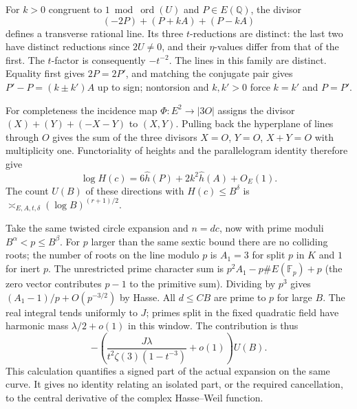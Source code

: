 \documentclass[11pt]{article}
\begin{document}
For $k>0$ congruent to $1\bmod\operatorname{ord}(U)$ and $P\in E(\mathbb Q)$, the divisor
\[
             (-2P)+(P+kA)+(P-kA)
\]
defines a transverse rational line. Its three $t$-reductions are distinct: the last two have distinct reductions since $2U\ne0$, and their $\eta$-values differ from that of the first. The $t$-factor is consequently $-t^{-2}$. The lines in this family are distinct. Equality first gives $2P=2P'$, and matching the conjugate pair gives $P'-P=(k\pm k')A$ up to sign; nontorsion and $k,k'>0$ force $k=k'$ and $P=P'$.

For completeness the incidence map $\Phi:E^2\to |3O|$ assigns the divisor $(X)+(Y)+(-X-Y)$ to $(X,Y)$. Pulling back the hyperplane of lines through $O$ gives the sum of the three divisors $X=O$, $Y=O$, $X+Y=O$ with multiplicity one. Functoriality of heights and the parallelogram identity therefore give
\[
 \log H(c)=6\widehat h(P)+2k^2\widehat h(A)+O_E(1).
\]
The count $U(B)$ of these directions with $H(c)\le B^\delta$ is $\asymp_{E,A,t,\delta}(\log B)^{(r+1)/2}$.

Take the same twisted circle expansion and $n=dc$, now with prime moduli $B^\alpha<p\le B^\beta$. For $p$ larger than the same sextic bound there are no colliding roots; the number of roots on the line modulo $p$ is $A_1=3$ for split $p$ in $K$ and $1$ for inert $p$. The unrestricted prime character sum is $p^2 A_1-p\#E(\mathbb F_p)+p$ (the zero vector contributes $p-1$ to the primitive sum). Dividing by $p^3$ gives $(A_1-1)/p+O(p^{-3/2})$ by Hasse. All $d\le CB$ are prime to $p$ for large $B$. The real integral tends uniformly to $J$; primes split in the fixed quadratic field have harmonic mass $\lambda/2+o(1)$ in this window. The contribution is thus
\[
 -\left(\frac{J\lambda}{t^2\zeta(3)(1-t^{-3})}+o(1)\right)U(B).
\]
This calculation quantifies a signed part of the actual expansion on the same curve. It gives no identity relating an isolated part, or the required cancellation, to the central derivative of the complex Hasse--Weil function.
\end{document}
